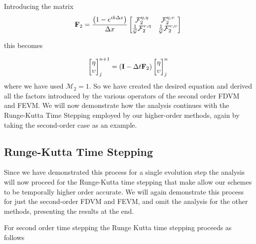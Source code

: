 Introducing the matrix
\begin{equation}
\label{eqn:FluxFactorMatrix}
\mathbf{F}_2 = \frac{\left(1 - e^{ik\Delta x}\right)}{\Delta x}\begin{bmatrix}
\mathcal{F}_2^{\eta,\eta} & \mathcal{F}_2^{\eta,\upsilon} \\ \frac{1}{\mathcal{G}}\mathcal{F}_2^{\upsilon,\eta} &  \frac{1}{\mathcal{G}}\mathcal{F}_2^{\upsilon,\upsilon} 
\end{bmatrix}
\end{equation}

this becomes

\begin{equation*}
\label{eqn:matrixevolupdate}
\begin{bmatrix}
\eta \\ \upsilon
\end{bmatrix}^{n+1}_j = \left(\mathbf{I}  - \Delta t \mathbf{F}_2 \right) \begin{bmatrix}
\eta \\ \upsilon
\end{bmatrix}^{n}_j
\end{equation*}
where we have used $\mathcal{M}_2 =1$. So we have created the desired equation and derived all the factors introduced by the various operators of the second order FDVM and FEVM. We will now demonstrate how the analysis continues with the Runge-Kutta Time Stepping employed by our higher-order methods, again by taking the second-order case as an example.

\subsection{Runge-Kutta Time Stepping}
Since we have demonstrated this process for a single evolution step the analysis will now proceed for the Runge-Kutta time stepping that make allow our schemes to be temporally higher order accurate. We will again demonstrate this process for just the second-order FDVM and FEVM, and omit the analysis for the other methods, presenting the results at the end.

For second order time stepping the Runge Kutta time stepping proceeds as follows


